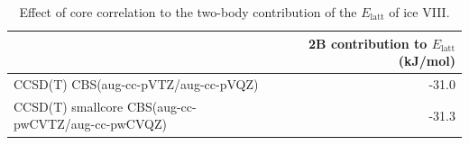 \begin{table}[h]

\caption{\label{tab:core_effect}Effect of core correlation to the two-body contribution of the $E_\text{latt}$ of ice VIII.}
\begin{tabular}{lr}
\toprule
 & 2B contribution to $E_\text{latt}$ (kJ/mol) \\ 
\midrule
CCSD(T) CBS(aug-cc-pVTZ/aug-cc-pVQZ) & -31.0 \\
CCSD(T) smallcore CBS(aug-cc-pwCVTZ/aug-cc-pwCVQZ) & -31.3 \\
\bottomrule
\end{tabular}

\end{table}